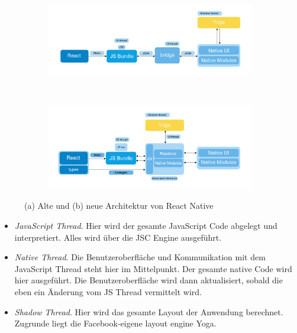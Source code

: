 \begin{figure}[tbt]
	\begin{subfigure}{\textwidth}
		\centering
		\includegraphics[scale=0.4]{Theoretische_Grundlagen/images/reactnative_architecture_old.png}
		\caption{}
		\label{fig:reactnative_architecture_old}
	\end{subfigure}\\
	\begin{subfigure}{\textwidth}
		\centering
		\includegraphics[scale=0.4]{Theoretische_Grundlagen/images/reactnative_architecture.png}
		\caption{}
		\label{fig:reactnative_architecture}
	\end{subfigure}
	\caption[Alte und neue Architektur von React Native]{(a) Alte und (b) neue Architektur von React Native \protect \footnotemark}
\end{figure}

\begin{itemize}
	\item \textit{JavaScript Thread}. Hier wird der gesamte JavaScript Code abgelegt und interpretiert. Alles wird über die JSC Engine ausgeführt.
	\item \textit{Native Thread}. Die Benutzeroberfläche und Kommunikation mit dem JavaScript Thread steht hier im Mittelpunkt. Der gesamte native Code wird hier ausgeführt. Die Benutzeroberfläche wird dann aktualisiert, sobald die eben ein Änderung vom JS Thread vermittelt wird.
	\item \textit{Shadow Thread}. Hier wird das gesamte Layout der Anwendung berechnet. Zugrunde liegt die Facebook-eigene layout engine \glqq Yoga\grqq .
\end{itemize}

